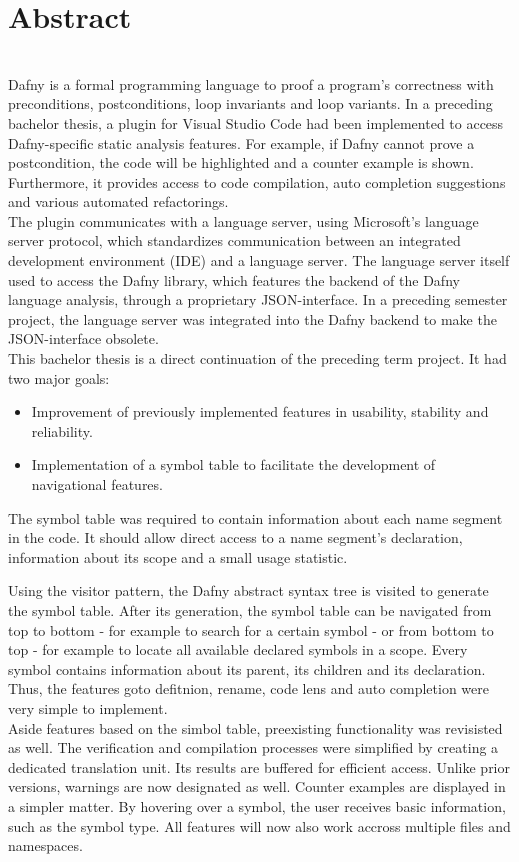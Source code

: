 \section{Abstract}
\\

Dafny is a formal programming language to proof a program's correctness with preconditions, postconditions, loop invariants and loop variants. In a preceding bachelor thesis, a plugin for Visual Studio Code had been implemented to access Dafny-specific static analysis features. For example, if Dafny cannot prove a postcondition, the code will be highlighted and a counter example is shown. Furthermore, it provides access to code compilation, auto completion suggestions and various automated refactorings.\\

The plugin communicates with a language server, using Microsoft's language server protocol, which standardizes communication between an integrated development environment (IDE) and a language server.  The language server itself used to access the Dafny library, which features the backend of the Dafny language analysis, through a proprietary JSON-interface. In a preceding semester project, the language server was integrated into the Dafny backend to make the JSON-interface obsolete.\\

This bachelor thesis is a direct continuation of the preceding term project. It had two major goals:
\begin{itemize}
    \item Improvement of previously implemented features in usability, stability and reliability.
    \item Implementation of a symbol table to facilitate the development of navigational features.
\end{itemize}
The symbol table was required to contain information about each name segment in the code. It should allow direct access to a name segment's declaration, information about its scope and a small usage statistic.

Using the visitor pattern, the Dafny abstract syntax tree is visited to generate the symbol table. After its generation, the symbol table can be navigated from top to bottom - for example to search for a certain symbol - or from bottom to top - for example to locate all available declared symbols in a scope. Every symbol contains information about its parent, its children and its declaration. Thus, the features goto defitnion, rename, code lens and auto completion were very simple to implement.\\

Aside features based on the simbol table, preexisting functionality was revisisted as well. The verification and compilation processes were simplified by creating a dedicated translation unit. Its results are buffered for efficient access. Unlike prior versions, warnings are now designated as well. Counter examples are displayed in a simpler matter. By hovering over a symbol, the user receives basic information, such as the symbol type. All features will now also work accross multiple files and namespaces.